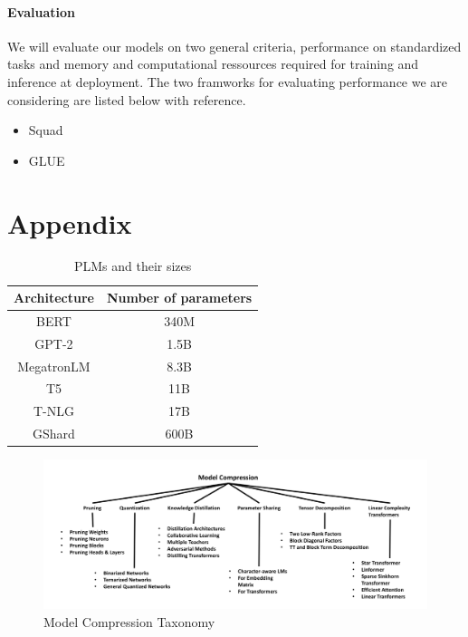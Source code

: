 \message{ !name(projectproposal.tex)}\documentclass{article}
\begin{document}
\paragraph{Evaluation} We will evaluate our models on two general criteria,
performance on standardized tasks and memory and computational ressources required
for training and inference at deployment. The two framworks for evaluating performance
we are considering are listed below with reference.
\begin{itemize}
  \item Squad\cite{squad}
  \item GLUE\cite{glue}
\end{itemize}


\clearpage



\clearpage
\appendix
\section{Appendix}

\begin{table}[htbp]
\centering
  \begin{tabular}{cc}
    \toprule
    Architecture & Number of parameters\\
    \midrule
    BERT & 340M\\
    GPT-2 & 1.5B\\
    MegatronLM & 8.3B\\
    T5 & 11B\\
    T-NLG & 17B\\
    GShard & 600B\\
    \bottomrule
  \end{tabular}
  \caption{PLMs and their sizes\cite{gupta2020compression}}\label{plmsize}
\end{table}

\begin{figure}[h]
  \centering
  \includegraphics[width=\textwidth]{illustrations/modelcompressiontaxonomy}
  \caption{Model Compression Taxonomy\cite{gupta2020compression}}\label{fig:modelcompression}
\end{figure}
\end{document}

